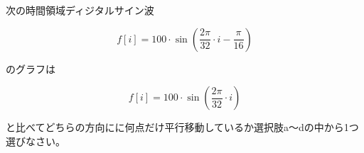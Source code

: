 次の時間領域ディジタルサイン波 

\[
f[i] = 100 \cdot \sin \left ( \frac{2 \pi}{32}  \cdot i - \frac{\pi}{16} \right )
\]

\noindent のグラフは

\[
f[i] = 100 \cdot \sin \left ( \frac{2 \pi}{32}  \cdot i \right )
\]

\noindent と比べてどちらの方向にに何点だけ平行移動しているか選択肢a〜dの中から1つ選びなさい。
